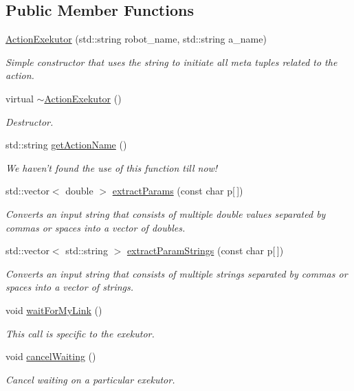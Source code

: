 \subsection*{\-Public \-Member \-Functions}
\begin{DoxyCompactItemize}
\item 
\hyperlink{classexekutor_1_1ActionExekutor_ab8278d222c8971ba739b8a2fb74f4052}{\-Action\-Exekutor} (std\-::string robot\-\_\-name, std\-::string a\-\_\-name)
\begin{DoxyCompactList}\small\item\em \-Simple constructor that uses the string to initiate all meta tuples related to the action. \end{DoxyCompactList}\item 
virtual \hyperlink{classexekutor_1_1ActionExekutor_ac06444627db2864e054cc9fc8ccf4d2e}{$\sim$\-Action\-Exekutor} ()
\begin{DoxyCompactList}\small\item\em \-Destructor. \end{DoxyCompactList}\item 
std\-::string \hyperlink{classexekutor_1_1ActionExekutor_a48d170d3931798f4019856fc0f070392}{get\-Action\-Name} ()
\begin{DoxyCompactList}\small\item\em \-We haven't found the use of this function till now! \end{DoxyCompactList}\item 
std\-::vector$<$ double $>$ \hyperlink{classexekutor_1_1ActionExekutor_a4b392ae5a75627136a0c69832628ff28}{extract\-Params} (const char p\mbox{[}$\,$\mbox{]})
\begin{DoxyCompactList}\small\item\em \-Converts an input string that consists of multiple double values separated by commas or spaces into a vector of doubles. \end{DoxyCompactList}\item 
std\-::vector$<$ std\-::string $>$ \hyperlink{classexekutor_1_1ActionExekutor_a0ba18a7fb0cfcd2043fab49e6807aec7}{extract\-Param\-Strings} (const char p\mbox{[}$\,$\mbox{]})
\begin{DoxyCompactList}\small\item\em \-Converts an input string that consists of multiple strings separated by commas or spaces into a vector of strings. \end{DoxyCompactList}\item 
void \hyperlink{classexekutor_1_1ActionExekutor_a842baca8b8c8481088a3024c2304ae92}{wait\-For\-My\-Link} ()
\begin{DoxyCompactList}\small\item\em \-This call is specific to the exekutor. \end{DoxyCompactList}\item 
void \hyperlink{classexekutor_1_1ActionExekutor_a2bf07fe6ee0038ce8d6209310c41a094}{cancel\-Waiting} ()
\begin{DoxyCompactList}\small\item\em \-Cancel waiting on a particular exekutor. \end{DoxyCompactList}\end{DoxyCompactItemize}
